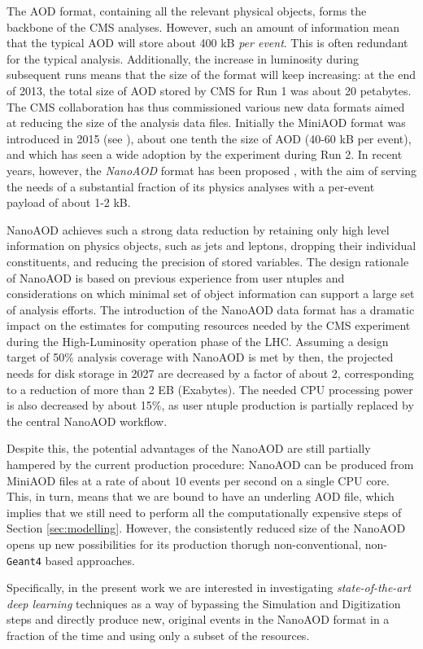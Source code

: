 The AOD format, containing all the relevant physical objects, forms the backbone of the CMS analyses. However, such an amount of information mean that the typical AOD will store about 400 kB \emph{per event}. This is often redundant for the typical analysis. Additionally, the increase in luminosity during subsequent runs means that the size of the format will keep increasing: at the end of 2013, the total size of AOD stored by CMS for Run 1 was about 20 petabytes. The CMS collaboration has thus commissioned various new data formats aimed at reducing the size of the analysis data files.
Initially the MiniAOD format was introduced in 2015 (see \cite{Petrucciani_2015}), about one tenth the size of AOD (40-60 kB per event), and which has seen a wide adoption by the experiment during Run 2. In recent years, however, the \emph{NanoAOD} format has been proposed \cite{Peruzzi_2020}, with the aim of serving the needs of a substantial fraction of its physics analyses with a per-event payload of about 1-2 kB.

NanoAOD achieves such a strong data reduction by retaining only high level information on physics objects, such as jets and leptons, dropping their individual constituents, and reducing the precision of stored variables.
The design rationale of NanoAOD is based on previous experience from user ntuples and considerations on which minimal set of object information can support a large set of analysis efforts. The introduction of the NanoAOD data format has a dramatic impact on the estimates for computing resources needed by the CMS experiment during the High-Luminosity operation phase of the LHC. Assuming a design target of 50$\%$ analysis coverage with NanoAOD is met by then, the projected needs for disk storage in 2027 are decreased by a factor of about 2, corresponding to a reduction of more than 2 EB (Exabytes). The needed CPU processing power is also decreased by about 15$\%$, as user ntuple production is partially replaced by the central NanoAOD workflow.

Despite this, the potential advantages of the NanoAOD are still partially hampered by the current production procedure: NanoAOD can be produced from MiniAOD files at a rate of about 10 events per second on a
single CPU core. This, in turn, means that we are bound to have an underling AOD file, which implies that we still need to perform all the computationally expensive steps of Section \ref{sec:modelling}.
However, the consistently reduced size of the NanoAOD opens up new possibilities for its production thorugh non-conventional, non-\texttt{Geant4} based approaches. 

Specifically, in the present work we are interested in investigating \emph{state-of-the-art deep learning} techniques as a way of bypassing the Simulation and Digitization steps and directly produce new, original events in the NanoAOD format in a fraction of the time and using only a subset of the resources.

